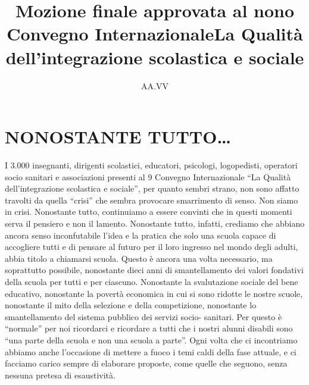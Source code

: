 \author{AA.VV}
\title{Mozione finale approvata al nono Convegno Internazionale\xheadbreak La Qualità dell'integrazione scolastica e sociale}
\label{cha:aavv101113}
\maketitle
{}
\section*{NONOSTANTE TUTTO\dots}
I 3.000 insegnanti, dirigenti scolastici, educatori, psicologi, logopedisti, operatori socio sanitari e associazioni presenti al 9 Convegno Internazionale “La Qualità dell'integrazione scolastica e sociale”, per quanto sembri strano, non sono affatto travolti da quella
“crisi” che sembra provocare smarrimento di senso. Non siamo in crisi.
Nonostante tutto, continuiamo a essere convinti che in questi momenti serva il pensiero
e non il lamento. Nonostante tutto, infatti, crediamo che abbiano ancora senso inconfutabile l'idea e la pratica che solo una scuola capace di accogliere tutti e di pensare al
futuro per il loro ingresso nel mondo degli adulti, abbia titolo a chiamarsi scuola. Questo è ancora una volta necessario, ma soprattutto possibile, nonostante dieci anni di
smantellamento dei valori fondativi della scuola per tutti e per ciascuno.
Nonostante la svalutazione sociale del bene educativo, nonostante la povertà economica in cui si sono ridotte le nostre scuole, nonostante il mito della selezione e della
competizione, nonostante lo smantellamento del sistema pubblico dei servizi socio-
sanitari.
Per questo è “normale” per noi ricordarci e ricordare a tutti che i nostri alunni disabili
sono “una parte della scuola e non una scuola a parte”.
Ogni volta che ci incontriamo abbiamo anche l'occasione di mettere a fuoco i temi caldi
della fase attuale, e ci facciamo carico sempre di elaborare proposte, come quelle che
seguono, senza nessuna pretesa di esaustività.
